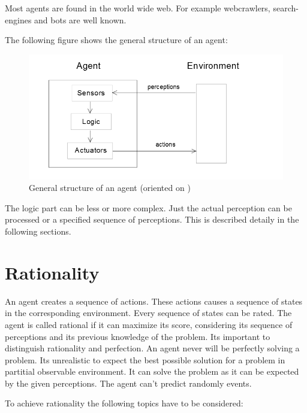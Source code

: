 \documentclass[10pt,a4paper,DIV=11]{scrreprt}
\begin{document}
Most agents are found in the world wide web. For example webcrawlers, search-engines and bots are well known.

The following figure shows the general structure of an agent:


\begin{center}
	\begin{figure}[H]
		\centering
		\includegraphics[width=1.0\textwidth,scale=1]{files/agent.png}  
		\caption{General structure of an agent (oriented on \cite{ki-book} )} 
		\label{fig:agent}
	\end{figure}
\end{center}

The logic part can be less or more complex. Just the actual perception can be processed or a specified sequence of perceptions. This is described detaily in the following sections.

\section{Rationality}
An agent creates a sequence of actions. These actions causes a sequence of states in the corresponding environment. Every sequence of states can be rated. The agent is called rational if it can maximize its score, considering its sequence of perceptions and its previous knowledge of the problem. Its important to distinguish rationality and perfection. An agent never will be perfectly solving a problem. Its unrealistic to expect the best possible solution for a problem in partitial observable environment. It can solve the problem as it can be expected by the given perceptions. The agent can't predict randomly events.

To achieve rationality the following topics have to be considered: \\

   \\
\end{document}

